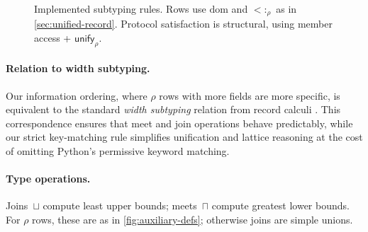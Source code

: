 \begin{figure}[t]
\centering
{}

\caption{Implemented subtyping rules. Rows use $\mathrm{dom}$ and $<:_\rho$ as in \cref{sec:unified-record}. Protocol satisfaction is structural, using member access + $\mathsf{unify}_{\rho}$.}
\label{fig:subtyping}
\end{figure}

\paragraph{Relation to width subtyping.}
Our information ordering, where $\rho$ rows with more fields are more specific, is
equivalent to the standard \emph{width subtyping} relation from record calculi
\cite{cardelli1992extensible}. This correspondence ensures that meet and join operations
behave predictably, while our strict key-matching rule simplifies unification and
lattice reasoning at the cost of omitting Python’s permissive keyword matching.

\paragraph{Type operations.}  
Joins~$\sqcup$ compute least upper bounds; meets~$\sqcap$ compute greatest lower bounds.  
For $\rho$ rows, these are as in \cref{fig:auxiliary-defs}; otherwise joins are simple unions.

